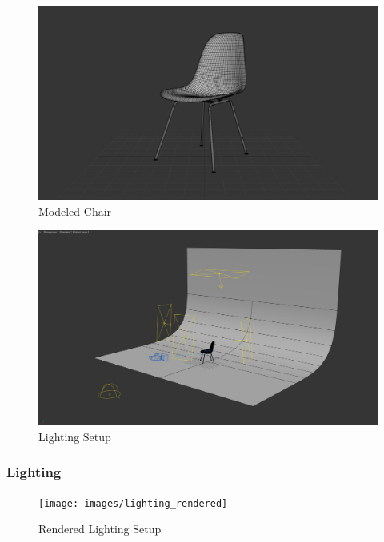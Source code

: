 \begin{figure}
\centering
\includegraphics[width=16cm]{images/modeling}
\caption{Modeled Chair}
\label{figure:modeling}
\end{figure}

\clearpage
\begin{figure}
\centering
\includegraphics[width=16cm]{images/lighting}
\caption{Lighting Setup}
\label{figure:lighting}
\end{figure}


\subsubsection{Lighting}

\begin{figure}
\vspace{-1cm}
\centering
\texttt{[image: images/lighting\_rendered]}
\caption{Rendered Lighting Setup}
\label{figure:lighting_rendered}
\end{figure}

